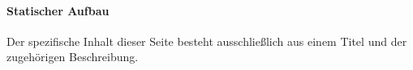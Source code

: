 \paragraph*{Statischer Aufbau}
Der spezifische Inhalt dieser Seite besteht ausschließlich aus einem Titel und der zugehörigen Beschreibung.

\begin{center}
    \captionsetup[figure]{labelformat=empty}
    \captionsetup[figure]{labelformat=default}
\end{center}
